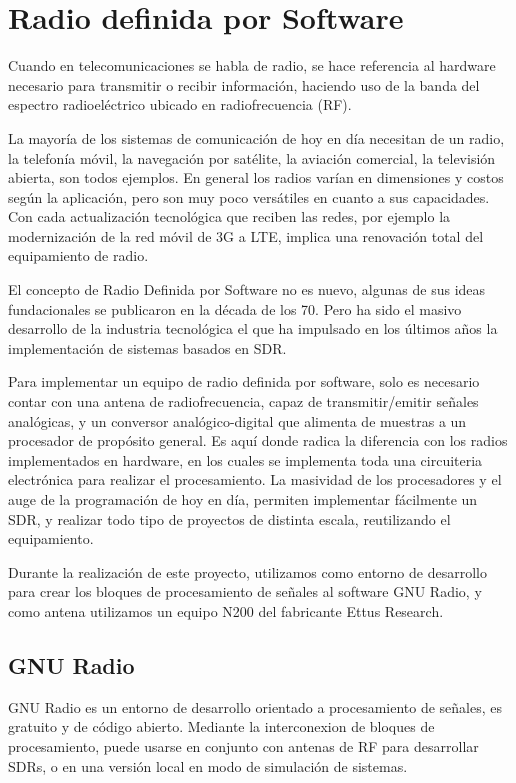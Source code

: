 \chapter{Radio definida por Software}

Cuando en telecomunicaciones se habla de radio, se hace referencia al hardware necesario para transmitir o recibir información, haciendo uso de la banda del espectro radioeléctrico ubicado en radiofrecuencia (RF).

La mayoría de los sistemas de comunicación de hoy en día necesitan de un radio, la telefonía móvil,  la navegación por satélite, la aviación comercial, la televisión abierta, son todos ejemplos. En general los radios varían en dimensiones y costos según la aplicación, pero son muy poco versátiles en cuanto a sus capacidades. Con cada actualización tecnológica que reciben las redes, por ejemplo la modernización de la red móvil de 3G a LTE, implica una renovación total del equipamiento de radio. 

El concepto de Radio Definida por Software no es nuevo, algunas de sus ideas fundacionales se publicaron en la década de los 70. Pero ha sido el masivo desarrollo de la industria tecnológica el que ha impulsado en los últimos años la implementación de sistemas basados en SDR. 

Para implementar un equipo de radio definida por software, solo es necesario contar con una antena de radiofrecuencia, capaz de transmitir/emitir señales analógicas, y un conversor analógico-digital que alimenta de muestras a un procesador de propósito general. Es aquí donde radica la diferencia con los radios implementados en hardware, en los cuales se implementa toda una circuiteria electrónica para realizar el procesamiento. La masividad de los procesadores y el auge de la programación de hoy en día, permiten implementar fácilmente un SDR, y realizar todo tipo de proyectos de distinta escala, reutilizando el equipamiento. 

Durante la realización de este proyecto, utilizamos como entorno de desarrollo para crear los bloques de procesamiento de señales al software GNU Radio, y como antena utilizamos un equipo N200 del fabricante Ettus Research. 

\section{GNU Radio}

GNU Radio es un entorno de desarrollo orientado a procesamiento de señales, es gratuito y de código abierto. Mediante la interconexion de bloques de procesamiento, puede usarse en conjunto con antenas de RF para desarrollar SDRs, o en una versión local en modo de simulación de sistemas.
 
